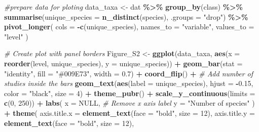 \documentclass[
]{article}
\newenvironment{Shaded}{\begin{snugshade}}{\end{snugshade}}
\newcommand{\AttributeTok}[1]{\textcolor[rgb]{0.13,0.29,0.53}{#1}}
\newcommand{\CommentTok}[1]{\textcolor[rgb]{0.56,0.35,0.01}{\textit{#1}}}
\newcommand{\ConstantTok}[1]{\textcolor[rgb]{0.56,0.35,0.01}{#1}}
\newcommand{\DecValTok}[1]{\textcolor[rgb]{0.00,0.00,0.81}{#1}}
\newcommand{\FloatTok}[1]{\textcolor[rgb]{0.00,0.00,0.81}{#1}}
\newcommand{\FunctionTok}[1]{\textcolor[rgb]{0.13,0.29,0.53}{\textbf{#1}}}
\newcommand{\NormalTok}[1]{#1}
\newcommand{\OtherTok}[1]{\textcolor[rgb]{0.56,0.35,0.01}{#1}}
\newcommand{\SpecialCharTok}[1]{\textcolor[rgb]{0.81,0.36,0.00}{\textbf{#1}}}
\newcommand{\StringTok}[1]{\textcolor[rgb]{0.31,0.60,0.02}{#1}}
\begin{document}
\begin{Shaded}
\begin{Highlighting}[]
\CommentTok{\#prepare data for ploting}
\NormalTok{data\_taxa }\OtherTok{\textless{}{-}}\NormalTok{ dat }\SpecialCharTok{\%\textgreater{}\%}
  \FunctionTok{group\_by}\NormalTok{(class) }\SpecialCharTok{\%\textgreater{}\%}
  \FunctionTok{summarise}\NormalTok{(}\AttributeTok{unique\_species =} \FunctionTok{n\_distinct}\NormalTok{(species), }\AttributeTok{.groups =} \StringTok{"drop"}\NormalTok{) }\SpecialCharTok{\%\textgreater{}\%}
  \FunctionTok{pivot\_longer}\NormalTok{(}
    \AttributeTok{cols =} \SpecialCharTok{{-}}\FunctionTok{c}\NormalTok{(unique\_species),}
    \AttributeTok{names\_to =} \StringTok{"variable"}\NormalTok{,}
    \AttributeTok{values\_to =} \StringTok{"level"}
\NormalTok{  )}

\CommentTok{\# Create plot with panel borders}
\NormalTok{Figure\_S2 }\OtherTok{\textless{}{-}} 
  \FunctionTok{ggplot}\NormalTok{(data\_taxa, }\FunctionTok{aes}\NormalTok{(}\AttributeTok{x =} \FunctionTok{reorder}\NormalTok{(level, unique\_species), }\AttributeTok{y =}\NormalTok{ unique\_species)) }\SpecialCharTok{+}
  \FunctionTok{geom\_bar}\NormalTok{(}\AttributeTok{stat =} \StringTok{"identity"}\NormalTok{, }\AttributeTok{fill =} \StringTok{"\#009E73"}\NormalTok{, }\AttributeTok{width =} \FloatTok{0.7}\NormalTok{) }\SpecialCharTok{+}
  \FunctionTok{coord\_flip}\NormalTok{() }\SpecialCharTok{+}
  \CommentTok{\# Add number of studies inside the bars}
  \FunctionTok{geom\_text}\NormalTok{(}\FunctionTok{aes}\NormalTok{(}\AttributeTok{label =}\NormalTok{ unique\_species), }
            \AttributeTok{hjust =} \SpecialCharTok{{-}}\FloatTok{0.15}\NormalTok{, }\AttributeTok{color =} \StringTok{"black"}\NormalTok{, }\AttributeTok{size =} \DecValTok{4}\NormalTok{) }\SpecialCharTok{+}
  \FunctionTok{theme\_pubr}\NormalTok{() }\SpecialCharTok{+}
  \FunctionTok{scale\_y\_continuous}\NormalTok{(}\AttributeTok{limits =} \FunctionTok{c}\NormalTok{(}\DecValTok{0}\NormalTok{, }\DecValTok{250}\NormalTok{)) }\SpecialCharTok{+}
  \FunctionTok{labs}\NormalTok{(}
    \AttributeTok{x =} \ConstantTok{NULL}\NormalTok{,  }\CommentTok{\# Remove x axis label}
    \AttributeTok{y =} \StringTok{"Number of species"}
\NormalTok{  ) }\SpecialCharTok{+}
  \FunctionTok{theme}\NormalTok{(}
    \AttributeTok{axis.title.x =} \FunctionTok{element\_text}\NormalTok{(}\AttributeTok{face =} \StringTok{"bold"}\NormalTok{, }\AttributeTok{size =} \DecValTok{12}\NormalTok{),}
    \AttributeTok{axis.title.y =} \FunctionTok{element\_text}\NormalTok{(}\AttributeTok{face =} \StringTok{"bold"}\NormalTok{, }\AttributeTok{size =} \DecValTok{12}\NormalTok{),}

\end{Highlighting}
\end{Shaded}
\end{document}
